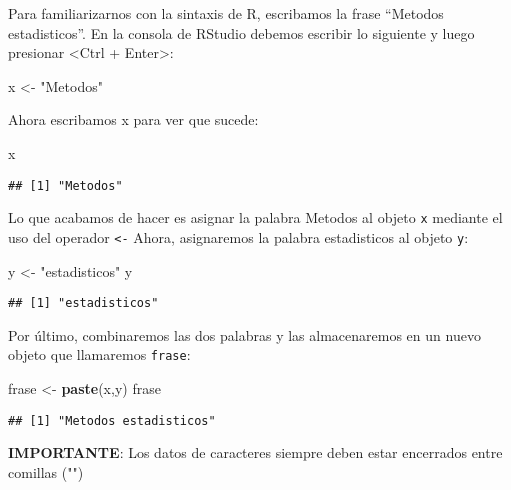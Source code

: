 \documentclass[]{book}
\newenvironment{Shaded}{\begin{snugshade}}{\end{snugshade}}
\newcommand{\KeywordTok}[1]{\textcolor[rgb]{0.13,0.29,0.53}{\textbf{#1}}}
\newcommand{\NormalTok}[1]{#1}
\newcommand{\StringTok}[1]{\textcolor[rgb]{0.31,0.60,0.02}{#1}}
\begin{document}
Para familiarizarnos con la sintaxis de R, escribamos la frase ``Metodos estadisticos''. En la consola de RStudio debemos escribir lo siguiente y luego presionar \textless Ctrl + Enter\textgreater:

\begin{Shaded}
\begin{Highlighting}[]
\NormalTok{x <-}\StringTok{ "Metodos"}
\end{Highlighting}
\end{Shaded}

Ahora escribamos x para ver que sucede:

\begin{Shaded}
\begin{Highlighting}[]
\NormalTok{x}
\end{Highlighting}
\end{Shaded}

\begin{verbatim}
## [1] "Metodos"
\end{verbatim}

Lo que acabamos de hacer es asignar la palabra Metodos al objeto \texttt{x} mediante el uso del operador \texttt{\textless{}-} Ahora, asignaremos la palabra estadisticos al objeto \texttt{y}:

\begin{Shaded}
\begin{Highlighting}[]
\NormalTok{y <-}\StringTok{ "estadisticos"}
\NormalTok{y}
\end{Highlighting}
\end{Shaded}

\begin{verbatim}
## [1] "estadisticos"
\end{verbatim}

Por último, combinaremos las dos palabras y las almacenaremos en un nuevo objeto que llamaremos \texttt{frase}:

\begin{Shaded}
\begin{Highlighting}[]
\NormalTok{frase <-}\StringTok{ }\KeywordTok{paste}\NormalTok{(x,y)}
\NormalTok{frase }
\end{Highlighting}
\end{Shaded}

\begin{verbatim}
## [1] "Metodos estadisticos"
\end{verbatim}

\textbf{IMPORTANTE}: Los datos de caracteres siempre deben estar encerrados entre comillas ("")
\end{document}
